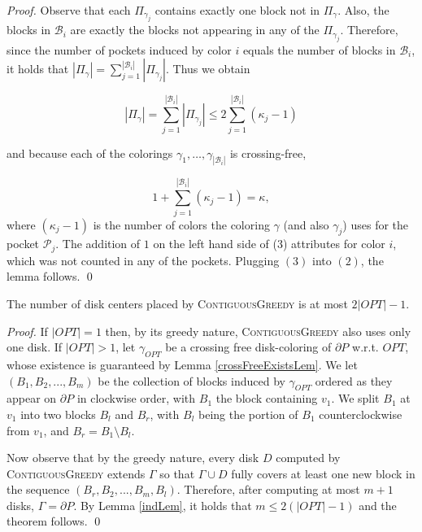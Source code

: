\documentclass{llncs}
\begin{document}
\begin{proof}
Observe that each $\Pi_{\gamma_j}$ contains exactly one block not in $\Pi_\gamma$.  Also, the blocks in $\mathcal{B}_i$ are exactly the blocks not appearing in any of the $\Pi_{\gamma_j}$.  Therefore, since the number of pockets induced by color $i$ equals the number of blocks in {$\mathcal{B}_i$},
it holds that $|\Pi_\gamma| =  \sum_{j=1}^{|\mathcal{B}_i|}  |\Pi_{\gamma_j}|$. Thus we obtain


\begin{equation}
|\Pi_\gamma| =  \sum_{j=1}^{|\mathcal{B}_i|}  |\Pi_{\gamma_j}| \leq 2\sum_{j=1}^{|\mathcal{B}_i|}  (\kappa_j - 1)
\end{equation}
 
\noindent and because each of the colorings $\gamma_1,  \ldots, \gamma_{|\mathcal{B}_i|}$ is crossing-free,

\begin{equation}
1 + \sum_{j=1}^{|\mathcal{B}_i|} (\kappa_j  - 1)  =  \kappa, 
\end{equation}
where $(\kappa_j - 1)$ is the number of colors the coloring {$\gamma$} (and also $\gamma_j$) uses for the pocket  $\mathcal{P}_j$.  {The addition of $1$ on the left hand side of (3) attributes for  color $i$}, which was not counted in any of the pockets.
Plugging $(3)$ into $(2)$, the lemma follows. 
\qed





\end{proof}








\begin{theorem}
The number of disk centers placed by \textsc{ContiguousGreedy} is at most $2|OPT| - 1$.
\end{theorem}
\begin{proof}


If $|OPT| = 1$ then, by its greedy nature, \textsc{ContiguousGreedy} also uses only one disk. 
If $|OPT| > 1$, let $\gamma_{{OPT}}$ be a crossing free disk-coloring of $\partial P$ w.r.t. ${OPT}$, whose existence is guaranteed by Lemma \ref{crossFreeExistsLem}. We let $(B_1, B_2, ..., B_m)$ be the collection of blocks induced by $\gamma_{{OPT}}$ ordered as they appear on $\partial P$  in clockwise order, with $B_1$ the block containing $v_1$. We split $B_1$ at $v_1$ into two blocks $B_l$ and $B_r$, with $B_l$ being the portion of $B_1$ counterclockwise from $v_1$, and $B_r = B_1 \setminus B_l$.

Now observe that by the greedy nature, every disk $D$ computed by \textsc{ContiguousGreedy} extends $\Gamma $ so that $\Gamma \cup D$ fully covers at least one new block in the sequence $(B_r, B_2, ..., B_m, B_l)$.  Therefore, after computing at most $m+1$ disks, $\Gamma = \partial P$. By Lemma \ref{indLem}, it holds that $m\leq 2(|OPT| - 1)$ and the theorem follows.  
\qed
\end{proof}
\end{document}
